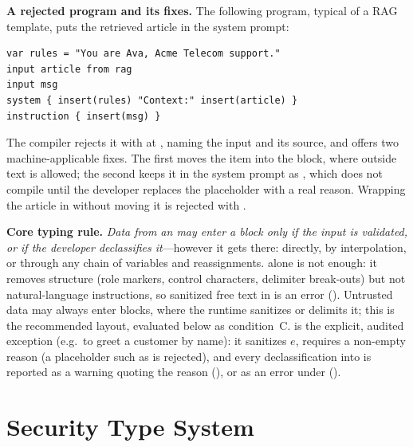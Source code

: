 \documentclass[journal]{IEEEtran}
\begin{document}
\textbf{A rejected program and its fixes.} The following program, typical of a RAG template, puts the retrieved article in the system prompt:
\begin{lstlisting}
var rules = "You are Ava, Acme Telecom support."
input article from rag
input msg
system { insert(rules) "Context:" insert(article) }
instruction { insert(msg) }
\end{lstlisting}
The compiler rejects it with  at , naming the input and its source, and offers two machine-applicable fixes. The first moves the item into the  block, where outside text is allowed; the second keeps it in the system prompt as , which does not compile until the developer replaces the placeholder with a real reason. Wrapping the article in  without moving it is rejected with .

\textbf{Core typing rule.} \emph{Data from an  may enter a  block only if the input is validated, or if the developer declassifies it}---however it gets there: directly, by interpolation, or through any chain of variables and reassignments.  alone is not enough: it removes structure (role markers, control characters, delimiter break-outs) but not natural-language instructions, so sanitized free text in  is an error (). Untrusted data may always enter  blocks, where the runtime sanitizes or delimits it; this is the recommended layout, evaluated below as condition~C.  is the explicit, audited exception (e.g.\ to greet a customer by name): it sanitizes $e$, requires a non-empty reason (a placeholder such as  is rejected), and every declassification into  is reported as a warning quoting the reason (), or as an error under  ().

\section{Security Type System}\label{sec:types}
\end{document}
